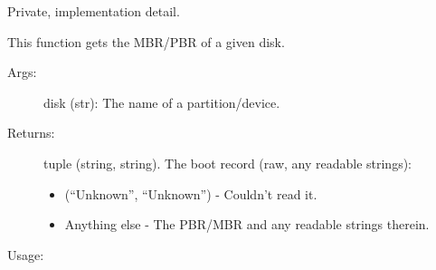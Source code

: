 \documentclass[letterpaper,10pt,english]{sphinxmanual}
\begin{document}
\begin{fulllineitems}
\label{\detokenize{cygwin:getdevinfo.cygwin.get_boot_record}}
Private, implementation detail.

This function gets the MBR/PBR of a given disk.
\begin{description}
\item[{Args:}] \leavevmode
disk (str):   The name of a partition/device.

\item[{Returns:}] \leavevmode
tuple (string, string). The boot record (raw, any readable strings):
\begin{itemize}
\item {} 
(“Unknown”, “Unknown”)     - Couldn’t read it.

\item {} 
Anything else              - The PBR/MBR and any readable strings therein.

\end{itemize}

\end{description}

Usage:

\begin{sphinxVerbatim}[commandchars=\\\{\}]
   
\end{sphinxVerbatim}

\end{fulllineitems}

\end{document}
